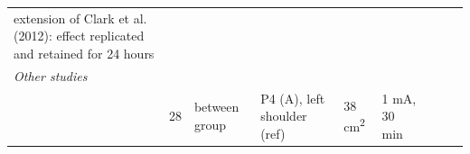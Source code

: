 \documentclass[11pt,english,]{memoir}
\begin{document}
\begin{longtable}[]{@{}lllllllll@{}}
\begin{minipage}[t]{0.25\columnwidth}
extension of Clark et al. (2012): effect
replicated and retained for 24 hours\strut
\end{minipage}\tabularnewline
\begin{minipage}[t]{0.08\columnwidth}\raggedright
\emph{Other studies}\strut
\end{minipage} & \begin{minipage}[t]{0.03\columnwidth}\raggedright
\strut
\end{minipage} & \begin{minipage}[t]{0.05\columnwidth}\raggedright
\strut
\end{minipage} & \begin{minipage}[t]{0.15\columnwidth}\raggedright
\strut
\end{minipage} & \begin{minipage}[t]{0.04\columnwidth}\raggedright
\strut
\end{minipage} & \begin{minipage}[t]{0.06\columnwidth}\raggedright
\strut
\end{minipage} & \begin{minipage}[t]{0.05\columnwidth}\raggedright
\strut
\end{minipage} & \begin{minipage}[t]{0.06\columnwidth}\raggedright
\strut
\end{minipage} & \begin{minipage}[t]{0.25\columnwidth}\raggedright
\strut
\end{minipage}\tabularnewline
\begin{minipage}[t]{0.08\columnwidth}\raggedright
\textcite{Callan2016}\strut
\end{minipage} & \begin{minipage}[t]{0.03\columnwidth}\raggedright
28\strut
\end{minipage} & \begin{minipage}[t]{0.05\columnwidth}\raggedright
between
group\strut
\end{minipage} & \begin{minipage}[t]{0.15\columnwidth}\raggedright
P4 (A), left shoulder (ref)\strut
\end{minipage} & \begin{minipage}[t]{0.04\columnwidth}\raggedright
38
cm\textsuperscript{2}\strut
\end{minipage} & \begin{minipage}[t]{0.06\columnwidth}\raggedright
1 mA, 30
min\strut
\end{minipage} & \begin{minipage}[t]{0.05\columnwidth}\raggedright

\end{minipage}
\end{longtable}
\end{document}

